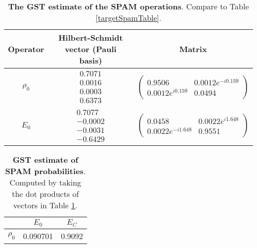 \documentclass{article}[11pt]
\begin{document}
\begin{table}[h]
\begin{center}
\begin{tabular}[l]{|c|c|c|}
\hline
Operator & Hilbert-Schmidt vector (Pauli basis) & Matrix \\ \hline
$\rho_{0}$ & $ \begin{array}{c}
0.7071 \\ 
0.0016 \\ 
0.0003 \\ 
0.6373
 \end{array} $
 & $ \left(\!\!\begin{array}{cc}
0.9506 & 0.0012e^{-i0.159} \\ 
0.0012e^{i0.159} & 0.0494
 \end{array}\!\!\right) $
 \\ \hline
$E_{0}$ & $ \begin{array}{c}
0.7077 \\ 
-0.0002 \\ 
-0.0031 \\ 
-0.6429
 \end{array} $
 & $ \left(\!\!\begin{array}{cc}
0.0458 & 0.0022e^{i1.648} \\ 
0.0022e^{-i1.648} & 0.9551
 \end{array}\!\!\right) $
 \\ \hline
\end{tabular}

\caption{\textbf{The GST estimate of the SPAM operations}.  Compare to Table \ref{targetSpamTable}.\label{bestGatesetSpamTable}}
\end{center}
\end{table}

\begin{table}[h]
\begin{center}
\begin{tabular}[l]{|c|c|c|}
\hline
 & $E_{0}$ & $E_C$ \\ \hline
$\rho_{0}$ & 0.090701 & 0.9092 \\ \hline
\end{tabular}

\caption{\textbf{GST estimate of SPAM probabilities}.  Computed by taking the dot products of vectors in Table \ref{bestGatesetSpamTable}.\label{bestGatesetSpamParametersTable}}
\end{center}
\end{table}
\end{document}
